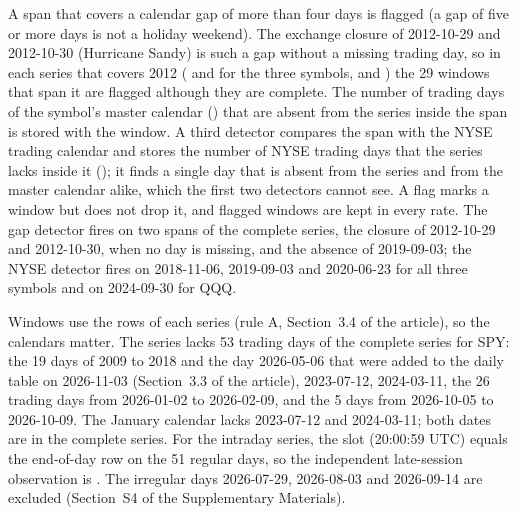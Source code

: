 A span that covers a calendar gap of more than four days is flagged (a gap of five or more days is not a holiday weekend). The exchange closure of 2012-10-29 and 2012-10-30 (Hurricane Sandy) is such a gap without a missing trading day, so in each series that covers 2012 ( and  for the three symbols, and ) the 29 windows that span it are flagged although they are complete. The number of trading days of the symbol's master calendar () that are absent from the series inside the span is stored with the window. A third detector compares the span with the NYSE trading calendar and stores the number of NYSE trading days that the series lacks inside it (); it finds a single day that is absent from the series and from the master calendar alike, which the first two detectors cannot see. A flag marks a window but does not drop it, and flagged windows are kept in every rate.
The gap detector fires on two spans of the complete series, the closure of 2012-10-29 and 2012-10-30, when no day is missing, and the absence of 2019-09-03; the NYSE detector fires on 2018-11-06, 2019-09-03 and 2020-06-23 for all three symbols and on 2024-09-30 for QQQ.

Windows use the rows of each series (rule A, Section~3.4 of the article), so the calendars matter. The series  lacks 53 trading days of the complete series for SPY: the 19 days of 2009 to 2018 and the day 2026-05-06 that were added to the daily table on 2026-11-03 (Section~3.3 of the article), 2023-07-12, 2024-03-11, the 26 trading days from 2026-01-02 to 2026-02-09, and the 5 days from 2026-10-05 to 2026-10-09. The January calendar lacks 2023-07-12 and 2024-03-11; both dates are in the complete series. For the intraday series, the  slot (20:00:59 UTC) equals the end-of-day row on the 51 regular days, so the independent late-session observation is . The irregular days 2026-07-29, 2026-08-03 and 2026-09-14 are excluded (Section~S4 of the Supplementary Materials).


